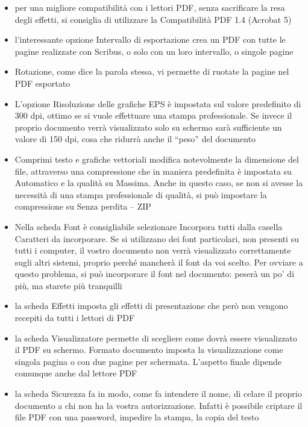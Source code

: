 \documentclass[a4paper, 12pt]{book}
\begin{document}
\begin{itemize}
	\item per una migliore compatibilità con i lettori PDF, senza sacrificare la resa degli effetti, si consiglia di utilizzare la Compatibilità PDF 1.4 (Acrobat 5)

	\item l'interessante opzione Intervallo di esportazione crea un PDF con tutte le pagine realizzate con Scribus, o solo con un loro intervallo, o singole pagine

	\item Rotazione, come dice la parola stessa, vi permette di ruotate la pagine nel PDF esportato

	\item L'opzione Risoluzione delle grafiche EPS è impostata sul valore predefinito di 300 dpi, ottimo se si vuole effettuare una stampa professionale. Se invece il proprio documento verrà visualizzato solo su schermo sarà sufficiente un valore di 150 dpi, cosa che ridurrà anche il “peso” del documento

	\item Comprimi testo e grafiche vettoriali modifica notevolmente la dimensione del file, attraverso una compressione che in maniera predefinita è impostata su Automatico e la qualità su Massima. Anche in questo caso, se non si avesse la necessità di una stampa professionale di qualità, si può impostare la compressione su Senza perdita – ZIP

	\item Nella scheda Font è consigliabile selezionare Incorpora tutti dalla casella Caratteri da incorporare. Se si utilizzano dei font particolari, non presenti su tutti i computer, il vostro documento non verrà visualizzato correttamente sugli altri sistemi, proprio perché mancherà il font da voi scelto. Per ovviare a questo problema, si può incorporare il font nel documento: peserà un po' di più, ma starete più tranquilli

	\item la scheda Effetti imposta gli effetti di presentazione che però non vengono recepiti da tutti i lettori di PDF

	\item la scheda Visualizzatore permette di scegliere come dovrà essere visualizzato il PDF su schermo. Formato documento imposta la visualizzazione come singola pagina o con due pagine per schermata. L'aspetto finale dipende comunque anche dal lettore PDF

	\item la scheda Sicurezza fa in modo, come fa intendere il nome, di celare il proprio documento a chi non ha la vostra autorizzazione. Infatti è possibile criptare il file PDF con una password, impedire la stampa, la copia del testo


\end{itemize}
\end{document}

